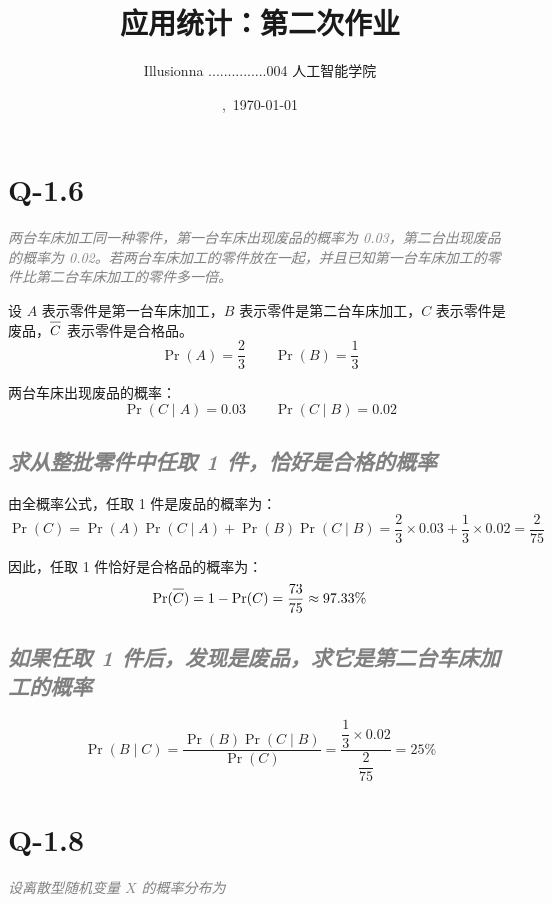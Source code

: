 \documentclass{article}
\title{应用统计：第二次作业}
\author{Illusionna \quad 2025...............004 \quad 人工智能学院}
\date{\currenttime,\ \today}
\newcommand{\barline}[1]{\overline{#1\rule{0pt}{1.9ex}}}
\begin{document}
\maketitle



\section{Q-1.6}
\textit{\textcolor{gray}{两台车床加工同一种零件，第一台车床出现废品的概率为 0.03，第二台出现废品的概率为 0.02。若两台车床加工的零件放在一起，并且已知第一台车床加工的零件比第二台车床加工的零件多一倍。}}

设 $A$ 表示零件是第一台车床加工，$B$ 表示零件是第二台车床加工，$C$ 表示零件是废品，$\barline{C}$ 表示零件是合格品。
\[ \Pr(A)=\dfrac{2}{3}\qquad\Pr(B)=\dfrac{1}{3} \]

两台车床出现废品的概率：
\[ \Pr(C\mid A)=0.03\qquad\Pr(C\mid B)=0.02 \]



\subsection{\textit{\textcolor{gray}{求从整批零件中任取 1 件，恰好是合格的概率}}}
由全概率公式，任取 1 件是废品的概率为：
\[ \Pr(C)=\Pr(A)\Pr(C\mid A)+\Pr(B)\Pr(C\mid B)=\dfrac{2}{3}\times0.03+\dfrac{1}{3}\times0.02=\dfrac{2}{75} \]

因此，任取 1 件恰好是合格品的概率为：
\[ \Pr(\barline{C})=1-\Pr(C)=\dfrac{73}{75}\approx97.33\% \]



\subsection{\textit{\textcolor{gray}{如果任取 1 件后，发现是废品，求它是第二台车床加工的概率}}}
\[ \Pr(B\mid C)=\dfrac{\Pr(B)\Pr(C\mid B)}{\Pr(C)}=\dfrac{\dfrac{1}{3}\times0.02}{\displaystyle\dfrac{2}{75}}=25\% \]



\section{Q-1.8}
\textit{\textcolor{gray}{设离散型随机变量 $X$ 的概率分布为}}

\begin{table}[H]
    \centering
    \renewcommand{\arraystretch}{1.2}
    \setlength{\tabcolsep}{16pt}
\end{table}
\end{document}
